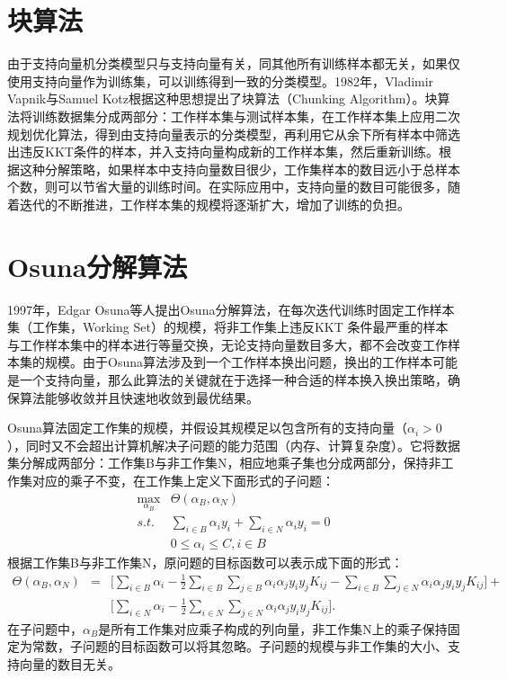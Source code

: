 \section{块算法}
由于支持向量机分类模型只与支持向量有关，同其他所有训练样本都无关，如果仅使用支持向量作为训练集，可以训练得到一致的分类模型。1982年，Vladimir Vapnik与Samuel Kotz根据这种思想提出了块算法（Chunking Algorithm）\cite{vapnik1982estimation}。块算法将训练数据集分成两部分：工作样本集与测试样本集，在工作样本集上应用二次规划优化算法，得到由支持向量表示的分类模型，再利用它从余下所有样本中筛选出违反KKT条件的样本，并入支持向量构成新的工作样本集，然后重新训练。根据这种分解策略，如果样本中支持向量数目很少，工作集样本的数目远小于总样本个数，则可以节省大量的训练时间。在实际应用中，支持向量的数目可能很多，随着迭代的不断推进，工作样本集的规模将逐渐扩大，增加了训练的负担。

\section{Osuna分解算法}
1997年，Edgar Osuna等人\cite{osuna1997support,osuna1997improved}提出Osuna分解算法，在每次迭代训练时固定工作样本集（工作集，Working Set）的规模，将非工作集上违反KKT 条件最严重的样本与工作样本集中的样本进行等量交换，无论支持向量数目多大，都不会改变工作样本集的规模。由于Osuna算法涉及到一个工作样本换出问题，换出的工作样本可能是一个支持向量，那么此算法的关键就在于选择一种合适的样本换入换出策略，确保算法能够收敛并且快速地收敛到最优结果。

Osuna算法固定工作集的规模，并假设其规模足以包含所有的支持向量（$\alpha_i>0$），同时又不会超出计算机解决子问题的能力范围（内存、计算复杂度）。它将数据集分解成两部分：工作集B与非工作集N，相应地乘子集也分成两部分，保持非工作集对应的乘子不变，在工作集上定义下面形式的子问题：
\begin{equation}
    \begin{array}{ll}
      \max\limits_{\alpha_B} & \Theta(\alpha_B,\alpha_N)\\
      \textit{s.t.} & \sum\limits_{i\in B} \alpha_i y_i + \sum\limits_{i\in N} \alpha_i y_i = 0 \\
      & 0\le \alpha_i \le C ,i\in B
    \end{array}
\end{equation}
根据工作集B与非工作集N，原问题的目标函数可以表示成下面的形式：
\begin{eqnarray}
    \Theta(\alpha_B,\alpha_N) &=&\big[\sum\limits_{i\in B} \alpha_i - \frac{1}{2} \sum\limits_{i\in B} \sum\limits_{j\in B} \alpha_i\alpha_j y_i y_j K_{ij} - \sum\limits_{i\in B}\sum\limits_{j\in N} \alpha_i\alpha_j y_i y_j K_{ij}\big] + \\
   && \big[\sum\limits_{i\in N} \alpha_i - \frac{1}{2} \sum\limits_{i\in N} \sum\limits_{j\in N} \alpha_i\alpha_j y_i y_j K_{ij}\big].
\end{eqnarray}
在子问题中，$\alpha_B$是所有工作集对应乘子构成的列向量，非工作集N上的乘子保持固定为常数，子问题的目标函数可以将其忽略。子问题的规模与非工作集的大小、支持向量的数目无关。

